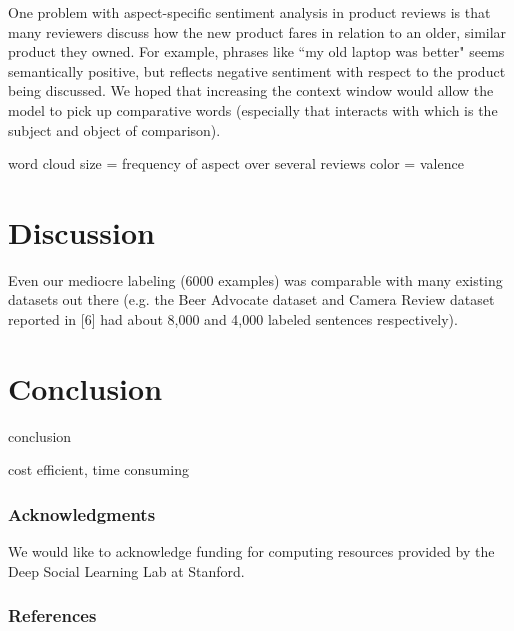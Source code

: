 \documentclass{article} %
\begin{document}
One problem with aspect-specific sentiment analysis in product reviews is that many reviewers discuss how the new product fares in relation to an older, similar product they owned. For example, phrases like ``my old laptop was better" seems semantically positive, but reflects negative sentiment with respect to the product being discussed. We hoped that increasing the context window would allow the model to pick up comparative words (especially that interacts with which is the subject and object of comparison).



word cloud
size = frequency of aspect over several reviews
color = valence

\section{Discussion}

Even our mediocre labeling (6000 examples) was comparable with many existing datasets out there (e.g. the Beer Advocate dataset and Camera Review dataset reported in [6] had about 8,000 and 4,000 labeled sentences respectively).

\section{Conclusion}

conclusion

cost efficient, time consuming






\subsubsection*{Acknowledgments}

We would like to acknowledge funding for computing resources provided by the Deep Social Learning Lab at Stanford.

\subsubsection*{References} %
\end{document}
